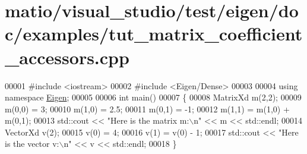 \hypertarget{matio_2visual__studio_2test_2eigen_2doc_2examples_2tut__matrix__coefficient__accessors_8cpp_source}{}\section{matio/visual\+\_\+studio/test/eigen/doc/examples/tut\+\_\+matrix\+\_\+coefficient\+\_\+accessors.cpp}
\label{matio_2visual__studio_2test_2eigen_2doc_2examples_2tut__matrix__coefficient__accessors_8cpp_source}

\begin{DoxyCode}
00001 \textcolor{preprocessor}{#include <iostream>}
00002 \textcolor{preprocessor}{#include <Eigen/Dense>}
00003 
00004 \textcolor{keyword}{using namespace }\hyperlink{namespace_eigen}{Eigen};
00005 
00006 \textcolor{keywordtype}{int} main()
00007 \{
00008   MatrixXd m(2,2);
00009   m(0,0) = 3;
00010   m(1,0) = 2.5;
00011   m(0,1) = -1;
00012   m(1,1) = m(1,0) + m(0,1);
00013   std::cout << \textcolor{stringliteral}{"Here is the matrix m:\(\backslash\)n"} << m << std::endl;
00014   VectorXd v(2);
00015   v(0) = 4;
00016   v(1) = v(0) - 1;
00017   std::cout << \textcolor{stringliteral}{"Here is the vector v:\(\backslash\)n"} << v << std::endl;
00018 \}
\end{DoxyCode}
